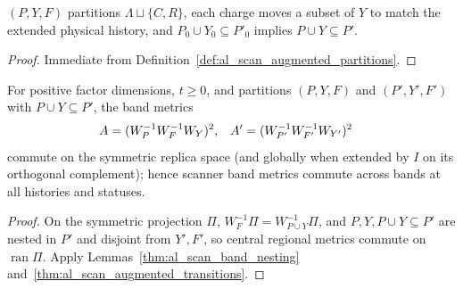 \begin{lemma}
    \label{thm:al_scan_augmented_transitions}
    \leanok
    $(P,Y,F)$ partitions $\Lambda\sqcup\{C,R\}$, each charge moves a subset of
    $Y$ to match the extended physical history, and $P_0\cup Y_0\subseteq P'_0$
    implies $P\cup Y\subseteq P'$.
\end{lemma}
\begin{proof}\leanok
    Immediate from Definition~\ref{def:al_scan_augmented_partitions}.
\end{proof}

\begin{lemma}
    \label{thm:al_scan_nested_band_metrics}
    \leanok
    For positive factor dimensions, $t\ge0$, and partitions $(P,Y,F)$ and
    $(P',Y',F')$ with $P\cup Y\subseteq P'$, the band metrics
    \begin{align}
        A  & =(W_P^{-1}W_F^{-1}W_Y)^2,                &
        A' & =(W_{P'}^{-1}W_{F'}^{-1}W_{Y'})^2 \notag
    \end{align}
    commute on the symmetric replica space (and globally when extended by $I$
    on its orthogonal complement); hence scanner band metrics commute across
    bands at all histories and statuses.
\end{lemma}
\begin{proof}\leanok
    On the symmetric projection $\Pi$, $W_F^{-1}\Pi=W_{P\cup Y}^{-1}\Pi$, and
    $P,Y,P\cup Y\subseteq P'$ are nested in $P'$ and disjoint from $Y',F'$, so
    central regional metrics commute on $\operatorname{ran}\Pi$. Apply
    Lemmas~\ref{thm:al_scan_band_nesting}
    and~\ref{thm:al_scan_augmented_transitions}.
\end{proof}

